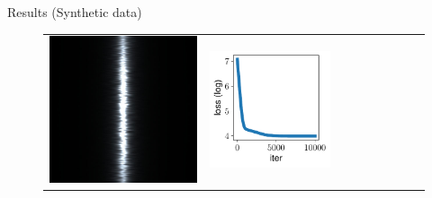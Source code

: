 \documentclass[final]{beamer}
\newlength{\twocolwid}
\newlength{\resultwidth}
\begin{document}
\begin{frame}[t]
\begin{columns}[t]
\begin{column}{\twocolwid}
\begin{block}{Results (Synthetic data)}
\begin{figure}[t]
\begin{tabular}{ccrclcccc}
            		\includegraphics[width=\resultwidth]{synth/metal/target.jpg} &
            		\includegraphics[width=\resultwidth]{synth/metal/loss.pdf} &

\end{tabular}
\end{figure}
\end{block}
\end{column}
\end{columns}
\end{frame}
\end{document}
